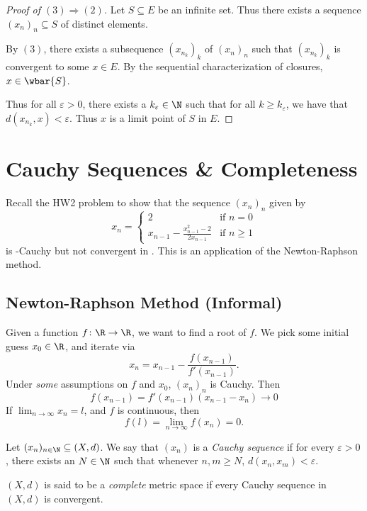 \begin{proof}[Proof of $(3) \Rightarrow (2)$]
    Let $S \subseteq E$ be an infinite set.
    Thus there exists a sequence $(x_n)_n \subseteq S$ of distinct elements.

    By $(3)$, there exists a subsequence $(x_{n_k})_k$ of $(x_n)_n$
    such that $(x_{n_k})_k$ is convergent to some $x \in E$.
    By the sequential characterization of closures, $x \in \wbar{S}$.

    Thus for all $\varepsilon > 0$, there exists a $k_\varepsilon \in \N$
    such that for all $k \ge k_\varepsilon$, we have that
    $d(x_{n_k}, x) < \varepsilon$.
    Thus $x$ is a limit point of $S$ in $E$.
\end{proof}

\section{Cauchy Sequences \& Completeness} \label{sec:cauchy}
Recall the HW2 problem to show that the sequence $(x_n)_n$ given by \[
    x_n = \begin{cases}
        2 & \text{if } n = 0 \\
        x_{n-1} - \frac{x_{n-1}^2 - 2}{2x_{n-1}} & \text{if } n \ge 1
    \end{cases}
\] is \Q-Cauchy but not convergent in \Q.
This is an application of the Newton-Raphson method.
\subsection{Newton-Raphson Method (Informal)}
\label{sec:newton-raphson_method}
Given a function $f\colon \R \to \R$, we want to find a root of $f$.
We pick some initial guess $x_0 \in \R$, and iterate via \[
    x_n = x_{n-1} - \frac{f(x_{n-1})}{f'(x_{n-1})}.
\] Under \emph{some} assumptions on $f$ and $x_0$, $(x_n)_n$ is Cauchy.
Then \[
    f(x_{n-1}) = f'(x_{n-1})(x_{n-1} - x_n) \to 0
\] If $\lim_{n \to \infty} x_n = l$, and $f$ is continuous, then \[
    f(l) = \lim_{n \to \infty} f(x_n) = 0.
\]
\begin{definition} \label{def:cauchy:sequence}
    Let $(x_n)_{n \in \N} \subseteq (X, d)$.
    We say that $(x_n)$ is a \emph{Cauchy sequence} if for every
    $\varepsilon > 0$, there exists an $N \in \N$ such that whenever
    $n, m \ge N$, $d(x_n, x_m) < \varepsilon$.
\end{definition}
\begin{definition*}[Completeness] \label{def:cauchy:completeness}
    $(X, d)$ is said to be a \emph{complete} metric space if every Cauchy
    sequence in $(X, d)$ is convergent.
\end{definition*}

